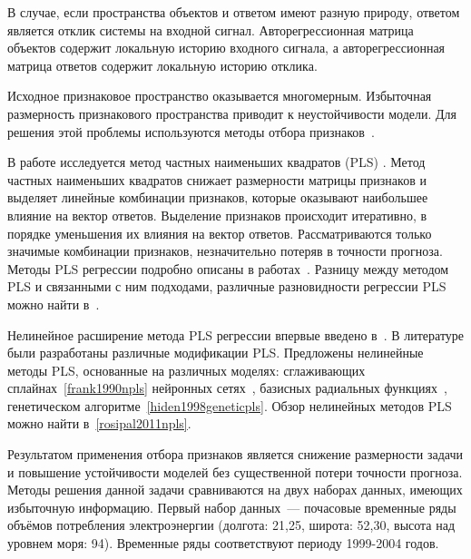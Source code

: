 \documentclass[12pt,twoside]{article}
\begin{document}
В случае, если пространства объектов и ответом имеют разную природу, ответом является отклик системы на входной сигнал. Авторегрессионная матрица объектов содержит локальную историю входного сигнала, а авторегрессионная матрица ответов содержит локальную историю отклика.

Исходное признаковое пространство оказывается многомерным. Избыточная размерность признакового пространства приводит к неустойчивости модели.
Для решения этой проблемы используются методы отбора признаков~\cite{li2016feature}.

В работе исследуется метод частных наименьших квадратов (PLS) \cite{wegelin2000survey,abdi2003pls,geladi1986partial}.
Метод частных наименьших квадратов снижает размерности матрицы признаков и выделяет линейные комбинации признаков, которые оказывают наибольшее влияние на вектор ответов. 
Выделение признаков происходит итеративно, в порядке уменьшения их влияния на вектор ответов. Рассматриваются только значимые комбинации признаков, незначительно потеряв в точности прогноза. 
Методы PLS регрессии подробно описаны в работах~\cite{geladi1988pls, hoskuldsson1988plsr}. 
Разницу между методом PLS и связанными с ним подходами, различные разновидности регрессии PLS можно найти в~\cite{rosipal2006overview}.

Нелинейное расширение метода PLS регрессии впервые введено в~\cite{wold1989nonlinear}. 
В литературе были разработаны различные модификации PLS. 
Предложены нелинейные методы PLS, основанные на различных моделях: 
сглаживающих сплайнах~\ref{frank1990npls} нейронных сетях~\cite{qin1992npls}, базисных радиальных функциях~\cite{yan2003geneticpls}, генетическом алгоритме~\ref{hiden1998geneticpls}. Обзор нелинейных методов PLS можно найти в~\ref{rosipal2011npls}.

Результатом применения отбора признаков является снижение размерности задачи и повышение устойчивости моделей без существенной потери точности прогноза.
Методы решения данной задачи сравниваются на двух наборах данных, имеющих избыточную информацию. 
Первый набор данных~--- почасовые временные ряды объёмов потребления электроэнергии (долгота: 21,25, широта: 52,30, высота над уровнем моря: 94). Временные ряды соответствуют периоду 1999-2004 годов. 
\end{document}
